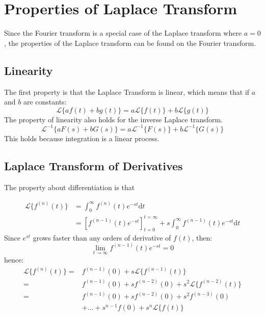 \section{Properties of Laplace Transform}
Since the Fourier transform is a special case of the Laplace transform where $a=0$, 
the properties of the Laplace transform can be found on the Fourier transform.  

\subsection{Linearity}
The first property is that the Laplace Transform is linear, which means that if $a$ and $b$ are constants: 
\begin{equation}
    \mathcal{L}\{af(t)+bg(t)\} = a\mathcal{L}\{f(t)\} + b\mathcal{L}\{g(t)\}
\end{equation}
The property of linearity also holds for the inverse Laplace transform. 
\begin{equation}
    \mathcal{L}^{-1}\{aF(s)+bG(s)\} = a\mathcal{L}^{-1}\{F(s)\} + b\mathcal{L}^{-1}\{G(s)\}
\end{equation}
This holds because integration is a linear process. 
 


\subsection{Laplace Transform of Derivatives}
The property about differentiation is that

\begin{align*}
    \mathcal{L}\{f^{(n)}(t)\} 
    &=  \int_{0}^{\infty} f^{(n)}(t) e^{-st} \mathrm{d}t     \\
    &=  \left[f^{(n-1)}(t) e^{-st}\right]_{t=0}^{t=\infty}
            +   s \int_{0}^{\infty} f^{(n-1)}(t) e^{-st} \mathrm{d}t
\end{align*}
Since $e^{st}$ grows faster than any orders of derivative of $f(t)$, then: 
$$\lim_{t\to\infty}f^{(n-1)}(t) e^{-st} = 0$$
hence: 
\begin{align*}
    \mathcal{L}\{f^{(n)}(t)\}   =&  f^{(n-1)}(0)
            +   s \mathcal{L} \{f^{(n-1)}(t)\}  \\
    =&  f^{(n-1)}(0)
            +   s f^{(n-2)}(0)
            +   s^{2} \mathcal{L} \{f^{(n-2)}(t)\}     \\
    =&  f^{(n-1)}(0)
            +   s f^{(n-2)}(0)
            +   s^{2} f^{(n-3)}(0)      \\
            &+   \dots
            +   s^{n-1} f(0)
            +   s^{n} \mathcal{L} \{ f(t) \}
\end{align*}

